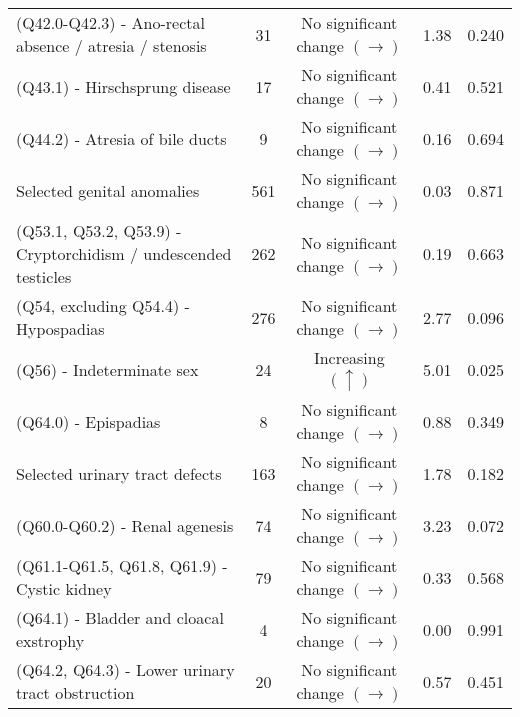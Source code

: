 \documentclass[
]{krantz}
\begin{document}
\begin{longtable}[t]{>{\raggedright\arraybackslash}p{4cm}cccc}
(Q42.0-Q42.3) - Ano-rectal absence / atresia / stenosis & 31 & \makecell[c]{No significant \\ change $\left(\rightarrow \right)$} & 1.38 & 0.240\\
(Q43.1) - Hirschsprung disease & 17 & \makecell[c]{No significant \\ change $\left(\rightarrow \right)$} & 0.41 & 0.521\\
(Q44.2) - Atresia of bile ducts & 9 & \makecell[c]{No significant \\ change $\left(\rightarrow \right)$} & 0.16 & 0.694\\
Selected genital anomalies & 561 & \makecell[c]{No significant \\ change $\left(\rightarrow \right)$} & 0.03 & 0.871\\
\addlinespace
(Q53.1, Q53.2, Q53.9) - Cryptorchidism / undescended testicles & 262 & \makecell[c]{No significant \\ change $\left(\rightarrow \right)$} & 0.19 & 0.663\\
(Q54, excluding Q54.4) - Hypospadias & 276 & \makecell[c]{No significant \\ change $\left(\rightarrow \right)$} & 2.77 & 0.096\\
(Q56) - Indeterminate sex & 24 & Increasing $\left(\uparrow \right)$ & 5.01 & 0.025\\
(Q64.0) - Epispadias & 8 & \makecell[c]{No significant \\ change $\left(\rightarrow \right)$} & 0.88 & 0.349\\
Selected urinary tract defects & 163 & \makecell[c]{No significant \\ change $\left(\rightarrow \right)$} & 1.78 & 0.182\\
\addlinespace
(Q60.0-Q60.2) - Renal agenesis & 74 & \makecell[c]{No significant \\ change $\left(\rightarrow \right)$} & 3.23 & 0.072\\
(Q61.1-Q61.5, Q61.8, Q61.9) - Cystic kidney & 79 & \makecell[c]{No significant \\ change $\left(\rightarrow \right)$} & 0.33 & 0.568\\
(Q64.1) - Bladder and cloacal exstrophy & 4 & \makecell[c]{No significant \\ change $\left(\rightarrow \right)$} & 0.00 & 0.991\\
(Q64.2, Q64.3) - Lower urinary tract obstruction & 20 & \makecell[c]{No significant \\ change $\left(\rightarrow \right)$} & 0.57 & 0.451\\

\end{longtable}
\end{document}
